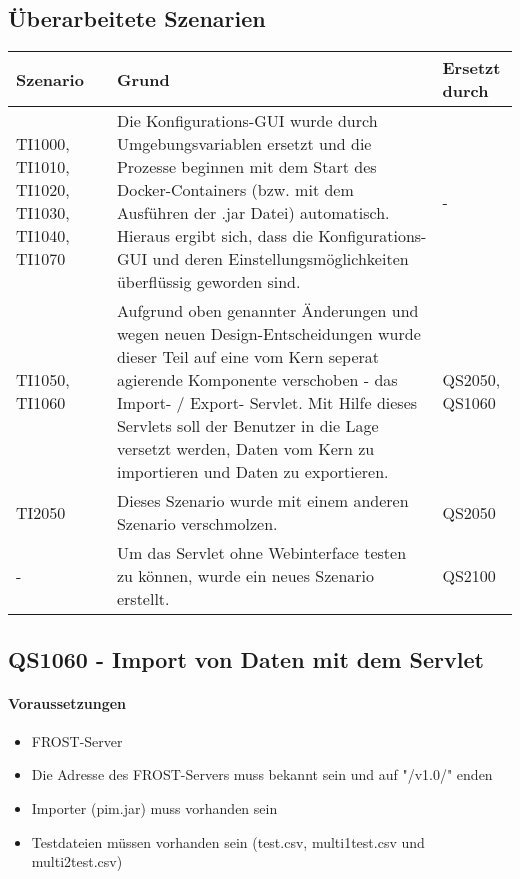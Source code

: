 \documentclass{article}
\begin{document}
\subsection{\"Uberarbeitete Szenarien}
\begin{table}[H]
\centering
\begin{tabular}{|L{1.3cm}|L{7cm}|L{2cm}|}
\hline
Szenario & Grund & Ersetzt durch\\
\hline
TI1000, TI1010, TI1020, TI1030, TI1040, TI1070 & Die Konfigurations-GUI wurde durch Umgebungsvariablen ersetzt und die Prozesse beginnen mit dem Start des Docker-Containers (bzw. mit dem Ausf\"uhren der .jar Datei) automatisch.
\newline
Hieraus ergibt sich, dass die Konfigurations-GUI und deren Einstellungsm\"oglichkeiten \"uberfl\"ussig geworden sind. & - \\ \hline
TI1050, TI1060 & Aufgrund oben genannter \"Anderungen und wegen neuen Design-Entscheidungen wurde dieser Teil auf eine vom Kern seperat agierende Komponente verschoben - das Import- / Export- Servlet.
\newline
Mit Hilfe dieses Servlets soll der Benutzer in die Lage versetzt werden, Daten vom Kern zu importieren und Daten zu exportieren. & QS2050, QS1060 \\ \hline
TI2050 & Dieses Szenario wurde mit einem anderen Szenario verschmolzen. & QS2050 \\ \hline
- & Um das Servlet ohne Webinterface testen zu können, wurde ein neues Szenario erstellt. & QS2100 \\ \hline
\end{tabular}
\end{table}

\newpage

\subsection{QS1060 - Import von Daten mit dem Servlet}
\paragraph{Voraussetzungen}
\begin{itemize}
\item FROST-Server
\item Die Adresse des FROST-Servers muss bekannt sein und auf "/v1.0/" enden
\item Importer (pim.jar) muss vorhanden sein
\item Testdateien müssen vorhanden sein (test.csv, multi1test.csv und multi2test.csv)
\end{itemize}
\end{document}
